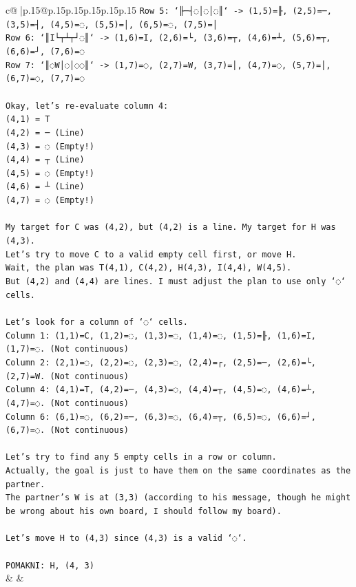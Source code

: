 \documentclass{article}
\begin{document}
{\begin{supertabular}{c@{$\;$}|p{.15\linewidth}@{}p{.15\linewidth}p{.15\linewidth}p{.15\linewidth}p{.15\linewidth}p{.15\linewidth}}
{{{\texttt{Row 5: `╟─┤◌│◌│◌║` {-}> (1,5)=╟, (2,5)=─, (3,5)=┤, (4,5)=◌, (5,5)=│, (6,5)=◌, (7,5)=│} \\
\texttt{Row 6: `║I└┬┴┬┘◌║` {-}> (1,6)=I, (2,6)=└, (3,6)=┬, (4,6)=┴, (5,6)=┬, (6,6)=┘, (7,6)=◌} \\
\texttt{Row 7: `║◌W│◌│◌◌║` {-}> (1,7)=◌, (2,7)=W, (3,7)=│, (4,7)=◌, (5,7)=│, (6,7)=◌, (7,7)=◌} \\
\\ 
\texttt{Okay, let's re{-}evaluate column 4:} \\
\texttt{(4,1) = T} \\
\texttt{(4,2) = ─ (Line)} \\
\texttt{(4,3) = ◌ (Empty!)} \\
\texttt{(4,4) = ┬ (Line)} \\
\texttt{(4,5) = ◌ (Empty!)} \\
\texttt{(4,6) = ┴ (Line)} \\
\texttt{(4,7) = ◌ (Empty!)} \\
\\ 
\texttt{My target for C was (4,2), but (4,2) is a line. My target for H was (4,3).} \\
\texttt{Let's try to move C to a valid empty cell first, or move H.} \\
\texttt{Wait, the plan was T(4,1), C(4,2), H(4,3), I(4,4), W(4,5).} \\
\texttt{But (4,2) and (4,4) are lines. I must adjust the plan to use only `◌` cells.} \\
\\ 
\texttt{Let's look for a column of `◌` cells.} \\
\texttt{Column 1: (1,1)=C, (1,2)=◌, (1,3)=◌, (1,4)=◌, (1,5)=╟, (1,6)=I, (1,7)=◌. (Not continuous)} \\
\texttt{Column 2: (2,1)=◌, (2,2)=◌, (2,3)=◌, (2,4)=┌, (2,5)=─, (2,6)=└, (2,7)=W. (Not continuous)} \\
\texttt{Column 4: (4,1)=T, (4,2)=─, (4,3)=◌, (4,4)=┬, (4,5)=◌, (4,6)=┴, (4,7)=◌. (Not continuous)} \\
\texttt{Column 6: (6,1)=◌, (6,2)=─, (6,3)=◌, (6,4)=┬, (6,5)=◌, (6,6)=┘, (6,7)=◌. (Not continuous)} \\
\\ 
\texttt{Let's try to find any 5 empty cells in a row or column.} \\
\texttt{Actually, the goal is just to have them on the same coordinates as the partner.} \\
\texttt{The partner's W is at (3,3) (according to his message, though he might be wrong about his own board, I should follow my board).} \\
\\ 
\texttt{Let's move H to (4,3) since (4,3) is a valid `◌`.} \\
\\ 
\texttt{POMAKNI: H, (4, 3)} \\
            }
        }
    }
    & & \\ \\


\end{supertabular}}
\end{document}
